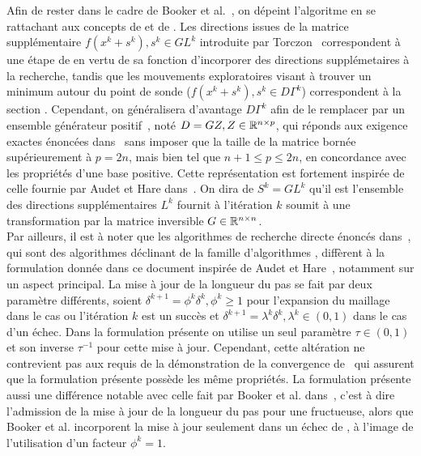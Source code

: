 Afin de rester dans le cadre de Booker et al.~\cite{BoDeFrSeToTr99a}, on dépeint l'algoritme en se rattachant aux concepts de \POLL{} et de \SEARCH{}. Les directions issues de la matrice supplémentaire $f(x^k + s^k), s^k \in GL^k$ introduite par Torczon~\cite{Torc97a} correspondent à une étape de \SEARCH{} en vertu de sa fonction d'incorporer des directions supplémetaires à la recherche, tandis que les mouvements exploratoires visant à trouver un minimum autour du point de sonde ($f(x^k + s^k), s^k \in D\Gamma^k$) correspondent à la section \POLL{}. Cependant, on généralisera d'avantage $D\Gamma^k$ afin de le remplacer par un ensemble générateur positif~\cite{Davi54b}, noté $D=GZ, Z\in \mathbb{R} ^{n\times p}$, qui réponds aux exigence exactes énoncées dans~\cite{Torc97a} sans imposer que la taille de la matrice bornée supérieurement à $p = 2n$, mais bien tel que $n+1 \leq p \leq 2n$, en concordance avec les propriétés d'une base positive. Cette représentation est fortement inspirée de celle fournie par Audet et Hare dans~\cite{AuHa2018}. On dira de $S^k =GL^k$ qu'il est l'ensemble des directions supplémentaires $L^k$ fournit à l'itération $k$ soumit à une transformation par la matrice inversible  $G \in \mathbb{R} ^{n \times n}$.\\
Par ailleurs, il est à noter que les algorithmes de recherche directe énoncés dans~\cite{LeTo96b,Torc97a,LeTo99a,LeTo00a}, qui sont des algorithmes déclinant de la famille d'algorithmes \GPS, diffèrent à la formulation donnée dans ce document inspirée de Audet et Hare~\cite{AuHa2018}, notamment sur un aspect principal. La mise à jour de la longueur du pas se fait par deux paramètre différents, soient $\delta^{k+1} =\phi^k \delta^k, \phi^k \geq 1$ pour l'expansion du maillage dans le cas ou l'itération $k$ est un succès et $\delta^{k+1} =\lambda^k \delta^k, \lambda^k \in (0,1)$ dans le cas d'un échec. Dans la formulation présente on utilise un seul paramètre $\tau \in (0,1)$ et son inverse $\tau^{-1}$ pour cette mise à jour. Cependant, cette altération ne contrevient pas aux requis de la démonstration de la convergence de~\cite{Torc97a} qui assurent que la formulation présente possède les même propriétés. La formulation présente aussi une différence notable avec celle fait par Booker et al. dans~\cite{BoDeFrSeToTr99a}, c'est à dire l'admission de la mise à jour de la longueur du pas pour une \SEARCH fructueuse, alors que Booker et al. incorporent la mise à jour seulement dans un échec de \POLL, à l'image de l'utilisation d'un facteur $\phi^k=1$.
